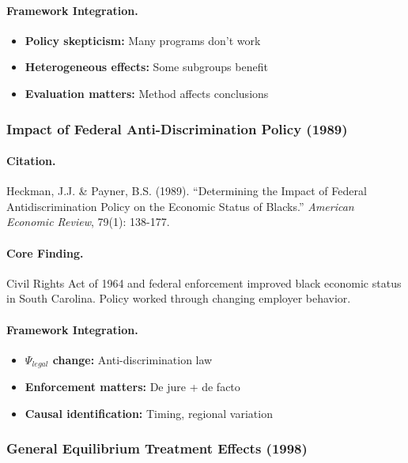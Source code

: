 \documentclass[12pt,a4paper]{article}
\begin{document}
\paragraph{Framework Integration.}
\begin{itemize}
  \item \textbf{Policy skepticism:} Many programs don't work
  \item \textbf{Heterogeneous effects:} Some subgroups benefit
  \item \textbf{Evaluation matters:} Method affects conclusions
\end{itemize}

\subsubsection{Impact of Federal Anti-Discrimination Policy (1989)}

\paragraph{Citation.}
Heckman, J.J. \& Payner, B.S. (1989). ``Determining the Impact of Federal
Antidiscrimination Policy on the Economic Status of Blacks.''
\emph{American Economic Review}, 79(1): 138-177.

\paragraph{Core Finding.}
Civil Rights Act of 1964 and federal enforcement improved black
economic status in South Carolina. Policy worked through changing
employer behavior.

\paragraph{Framework Integration.}
\begin{itemize}
  \item \textbf{$\Psi_{legal}$ change:} Anti-discrimination law
  \item \textbf{Enforcement matters:} De jure + de facto
  \item \textbf{Causal identification:} Timing, regional variation
\end{itemize}

\subsubsection{General Equilibrium Treatment Effects (1998)}
\end{document}
